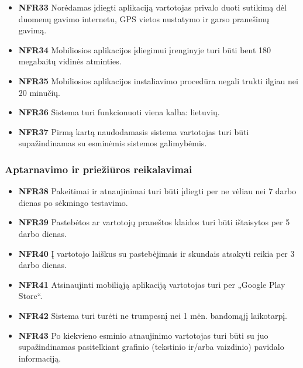 \documentclass{VUMIFPSbakalaurinis}
\begin{document}
\begin{itemize}
	\item \textbf{NFR33} Norėdamas įdiegti aplikaciją vartotojas privalo duoti sutikimą dėl duomenų gavimo internetu, GPS vietos nustatymo ir garso pranešimų gavimą.
	\item \textbf{NFR34} Mobiliosios aplikacijos įdiegimui įrenginyje turi būti bent 180 megabaitų vidinės atminties.
	\item \textbf{NFR35} Mobiliosios aplikacijos instaliavimo procedūra negali trukti ilgiau nei 20 minučių.
\end{itemize}

\begin{itemize}
	\item \textbf{NFR36} Sistema turi funkcionuoti viena kalba: lietuvių.
	\item \textbf{NFR37} Pirmą kartą naudodamasis sistema vartotojas turi būti supažindinamas su esminėmis sistemos galimybėmis.
\end{itemize}

\subsubsection{Aptarnavimo ir priežiūros reikalavimai}
\begin{itemize}
	\item \textbf{NFR38} Pakeitimai ir atnaujinimai turi būti įdiegti per ne vėliau nei 7 darbo dienas po sėkmingo testavimo.
	\item \textbf{NFR39} Pastebėtos ar vartotojų praneštos klaidos turi būti ištaisytos per 5 darbo dienas.
	\item \textbf{NFR40} Į vartotojo laiškus su pastebėjimais ir skundais atsakyti reikia per 3 darbo dienas.
	\item \textbf{NFR41} Atsinaujinti mobiliąją aplikaciją vartotojas turi per „Google Play Store“.
	\item \textbf{NFR42} Sistema turi turėti ne trumpesnį nei 1 mėn. bandomąjį laikotarpį.
	\item \textbf{NFR43} Po kiekvieno esminio atnaujinimo vartotojas turi būti su juo supažindinamas pasitelkiant grafinio (tekstinio ir/arba vaizdinio) pavidalo informaciją.
\end{itemize}
\end{document}
